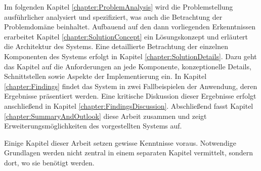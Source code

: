         Im folgenden Kapitel \ref{chapter:ProblemAnalysis} wird die Problemstellung ausführlicher
        analysiert und spezifiziert, was auch die Betrachtung der Problemdomäne beinhaltet.
        Aufbauend auf den dann vorliegenden Erkenntnissen erarbeitet
        Kapitel \ref{chapter:SolutionConcept}
        ein Lösungskonzept und erläutert die Architektur des Systems.
        Eine detaillierte Betrachtung der einzelnen Komponenten des Systems
        erfolgt in Kapitel \ref{chapter:SolutionDetails}.
        Dazu geht das Kapitel auf die Anforderungen an jede Komponente,
        konzeptionelle Details, Schnittstellen sowie Aspekte der Implementierung ein.       
        In Kapitel \ref{chapter:Findings} findet das System in zwei Fallbeispielen der {\fernUni}
        Anwendung, deren Ergebnisse präsentiert werden.
        Eine kritische Diskussion dieser Ergebnisse erfolgt anschließend in
        Kapitel \ref{chapter:FindingsDiscussion}.
        Abschließend fasst Kapitel \ref{chapter:SummaryAndOutlook}
        diese Arbeit zusammen und zeigt Erweiterungsmöglichkeiten
        des vorgestellten Systems auf.

        Einige Kapitel dieser Arbeit setzen gewisse Kenntnisse voraus.
        Notwendige Grundlagen werden nicht zentral in einem separaten Kapitel vermittelt,
        sondern dort, wo sie benötigt werden.
